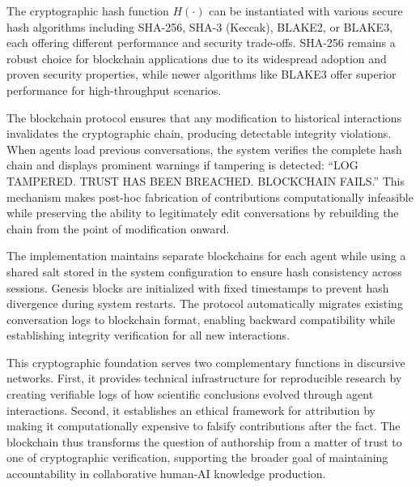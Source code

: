 \documentclass[12pt]{article}
\theoremstyle{definition}
\begin{document}
The cryptographic hash function $H(\cdot)$ can be instantiated with various secure hash algorithms including SHA-256, SHA-3 (Keccak), BLAKE2, or BLAKE3, each offering different performance and security trade-offs. SHA-256 remains a robust choice for blockchain applications due to its widespread adoption and proven security properties, while newer algorithms like BLAKE3 offer superior performance for high-throughput scenarios.

The blockchain protocol ensures that any modification to historical interactions invalidates the cryptographic chain, producing detectable integrity violations. When agents load previous conversations, the system verifies the complete hash chain and displays prominent warnings if tampering is detected: ``LOG TAMPERED. TRUST HAS BEEN BREACHED. BLOCKCHAIN FAILS.'' This mechanism makes post-hoc fabrication of contributions computationally infeasible while preserving the ability to legitimately edit conversations by rebuilding the chain from the point of modification onward.

The implementation maintains separate blockchains for each agent while using a shared salt stored in the system configuration to ensure hash consistency across sessions. Genesis blocks are initialized with fixed timestamps to prevent hash divergence during system restarts. The protocol automatically migrates existing conversation logs to blockchain format, enabling backward compatibility while establishing integrity verification for all new interactions.

This cryptographic foundation serves two complementary functions in discursive networks. First, it provides technical infrastructure for reproducible research by creating verifiable logs of how scientific conclusions evolved through agent interactions. Second, it establishes an ethical framework for attribution by making it computationally expensive to falsify contributions after the fact. The blockchain thus transforms the question of authorship from a matter of trust to one of cryptographic verification, supporting the broader goal of maintaining accountability in collaborative human-AI knowledge production.
\end{document}
